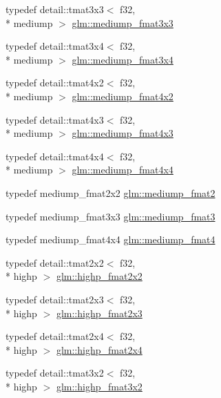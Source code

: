 \begin{DoxyCompactItemize}
\item 
typedef detail\-::tmat3x3$<$ f32, \\*
mediump $>$ \hyperlink{group__gtc__type__precision_gaa7f015dd5b962a658178bb881d4620cc}{glm\-::mediump\-\_\-fmat3x3}
\item 
typedef detail\-::tmat3x4$<$ f32, \\*
mediump $>$ \hyperlink{group__gtc__type__precision_gafa5aaa948365f349840dfeb9eeebf0cd}{glm\-::mediump\-\_\-fmat3x4}
\item 
typedef detail\-::tmat4x2$<$ f32, \\*
mediump $>$ \hyperlink{group__gtc__type__precision_ga09a2851d38fe3cf52735a1d26199bdcc}{glm\-::mediump\-\_\-fmat4x2}
\item 
typedef detail\-::tmat4x3$<$ f32, \\*
mediump $>$ \hyperlink{group__gtc__type__precision_ga5e5de428d1e1da2c593a6245d92dd8c0}{glm\-::mediump\-\_\-fmat4x3}
\item 
typedef detail\-::tmat4x4$<$ f32, \\*
mediump $>$ \hyperlink{group__gtc__type__precision_ga7f4ae9d05ca94005a0b7d8e3c59943cd}{glm\-::mediump\-\_\-fmat4x4}
\item 
typedef mediump\-\_\-fmat2x2 \hyperlink{group__gtc__type__precision_ga5b9de77ef7403ffc972700219eca5450}{glm\-::mediump\-\_\-fmat2}
\item 
typedef mediump\-\_\-fmat3x3 \hyperlink{group__gtc__type__precision_ga85f2267401434ea8c5463af040f0760c}{glm\-::mediump\-\_\-fmat3}
\item 
typedef mediump\-\_\-fmat4x4 \hyperlink{group__gtc__type__precision_ga6cd3ae1f3509b79061edcc83564769d4}{glm\-::mediump\-\_\-fmat4}
\item 
typedef detail\-::tmat2x2$<$ f32, \\*
highp $>$ \hyperlink{group__gtc__type__precision_gaeb76f1230ecfd4c80635d3c618405e31}{glm\-::highp\-\_\-fmat2x2}
\item 
typedef detail\-::tmat2x3$<$ f32, \\*
highp $>$ \hyperlink{group__gtc__type__precision_ga53c126d1650b460bc7496a6fd5e5e764}{glm\-::highp\-\_\-fmat2x3}
\item 
typedef detail\-::tmat2x4$<$ f32, \\*
highp $>$ \hyperlink{group__gtc__type__precision_ga5df8430c47272adc901ef224d85a9c4d}{glm\-::highp\-\_\-fmat2x4}
\item 
typedef detail\-::tmat3x2$<$ f32, \\*
highp $>$ \hyperlink{group__gtc__type__precision_gad5c083691eb15539fd81e27e1dc6b813}{glm\-::highp\-\_\-fmat3x2}

\end{DoxyCompactItemize}
